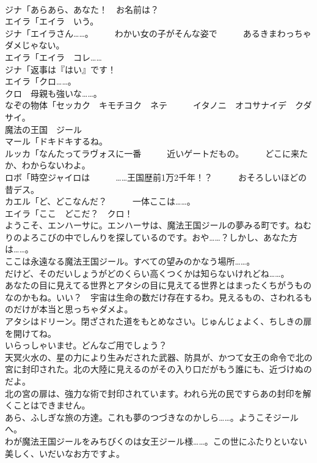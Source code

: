 \documentclass[8pt]{extreport}
\begin{document}
\begin{CJK}{UTF8}{min}
\\	ジナ「あらあら、あなた！　お名前は？	
\\	エイラ「エイラ　いう。	
\\	ジナ「エイラさん……。　　　わかい女の子がそんな姿で　　　あるきまわっちゃダメじゃない。	
\\	エイラ「エイラ　コレ……	
\\	ジナ「返事は『はい』です！	
\\	エイラ「クロ……。	
\\	クロ　母親も強いな……。	
\\	なぞの物体「セッカク　キモチヨク　ネテ　　　イタノニ　オコサナイデ　クダサイ。	
\\	魔法の王国　ジール	
\\	マール「ドキドキするね。	
\\	ルッカ「なんたってラヴォスに一番　　　近いゲートだもの。　　　どこに来たか、わからないわよ。	
\\	ロボ「時空ジャイロは　　　……王国歴前1万2千年！？　　　おそろしいほどの昔デス。	
\\	カエル「ど、どこなんだ？　　　一体ここは……。	
\\	エイラ「ここ　どこだ？　クロ！	
\\	ようこそ、エンハーサに。エンハーサは、魔法王国ジールの夢みる町です。ねむりのよろこびの中でしんりを探しているのです。おや……？しかし、あなた方は……。	
\\	ここは永遠なる魔法王国ジール。すべての望みのかなう場所……。	
\\	だけど、そのだいしょうがどのくらい高くつくかは知らないけれどね……。	
\\	あなたの目に見えてる世界とアタシの目に見えてる世界とはまったくちがうものなのかもね。いい？　宇宙は生命の数だけ存在するわ。見えるもの、さわれるものだけが本当と思っちゃダメよ。	
\\	アタシはドリーン。閉ざされた道をもとめなさい。じゅんじょよく、ちしきの扉を開けてね。	
\\	いらっしゃいませ。どんなご用でしょう？	
\\	天冥火水の、星の力により生みだされた武器、防具が、かつて女王の命令で北の宮に封印された。北の大陸に見えるのがその入り口だがもう誰にも、近づけぬのだよ。	
\\	北の宮の扉は、強力な術で封印されています。われら光の民ですらあの封印を解くことはできません。	
\\	あら、ふしぎな旅の方達。これも夢のつづきなのかしら……。ようこそジールへ。	
\\	わが魔法王国ジールをみちびくのは女王ジール様……。この世にふたりといない美しく、いだいなお方ですよ。	

\end{CJK}
\end{document}

